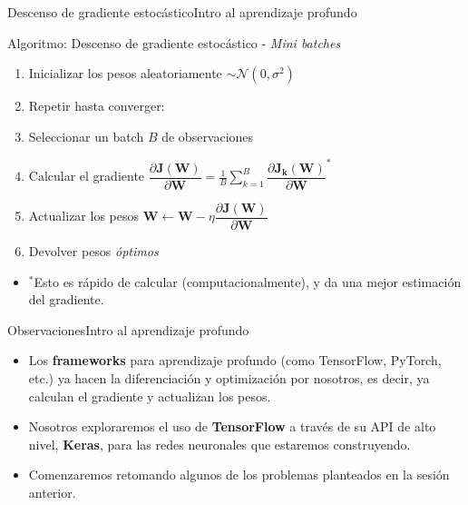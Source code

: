 \documentclass[10pt,border=3pt,tikz]{beamer}
\begin{document}
    \begin{frame}{Descenso de gradiente estocástico}{Intro al aprendizaje profundo}
        \begin{block}{Algoritmo: Descenso de gradiente estocástico - \textit{Mini batches}}
            \begin{enumerate}
                \item Inicializar los pesos aleatoriamente $\sim \mathcal{N}(0,\sigma^2)$
                \item Repetir hasta converger:
                \item \hspace*{8pt} Seleccionar un batch $B$ de observaciones
                \item \hspace*{8pt} Calcular el gradiente \colorbox{yellow!20}{$\dfrac{\partial \mathbf{J(W)}}{\partial \mathbf{W}} = \frac{1}{B} \sum_{k=1}^B \dfrac{\partial \mathbf{J_k(W)}}{\partial \mathbf{W}}^*$}
                \item \hspace*{8pt} Actualizar los pesos $\mathbf{W} \leftarrow \mathbf{W} - \eta \dfrac{\partial \mathbf{J(W)}}{\partial \mathbf{W}}$
                \item Devolver pesos \textit{óptimos}
            \end{enumerate}
        \end{block}
        \begin{itemize}
            \item $^*$Esto es rápido de calcular (computacionalmente), y da una mejor estimación del gradiente.
        \end{itemize}
    \end{frame}
    
    \begin{frame}{Observaciones}{Intro al aprendizaje profundo}
        \begin{itemize}
            \item Los \textbf{frameworks} para aprendizaje profundo (como TensorFlow, PyTorch, etc.) ya hacen la diferenciación y optimización por nosotros, es decir, ya calculan el gradiente y actualizan los pesos.
            \item Nosotros exploraremos el uso de \textbf{TensorFlow} a través de su API de alto nivel, \textbf{Keras}, para las redes neuronales que estaremos construyendo.
            \item Comenzaremos retomando algunos de los problemas planteados en la sesión anterior.
        \end{itemize}
    \end{frame}
    
\end{document}
